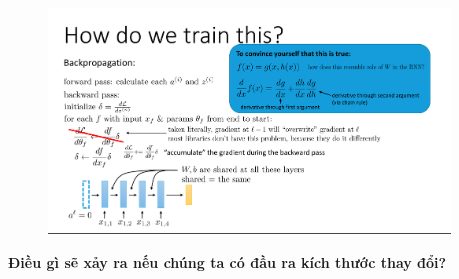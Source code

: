 \documentclass{book}
\begin{document}
\begin{figure}[H]
    \centering
    \includegraphics[width=0.95\textwidth]{images/lec10_5.png}
\end{figure}
\textbf{Điều gì sẽ xảy ra nếu chúng ta có đầu ra kích thước thay đổi?}
\end{document}
